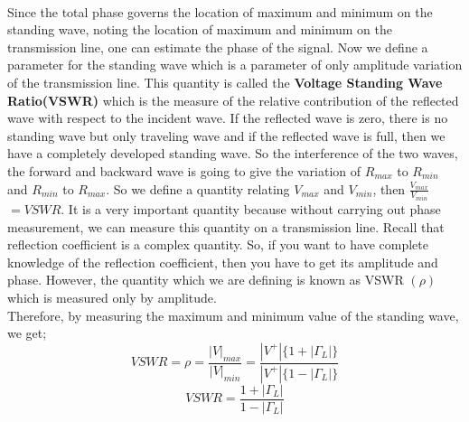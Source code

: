 	\\ Since the total phase governs the location of maximum and minimum on the standing wave, noting the location of maximum and minimum on the transmission line, one can estimate the phase of the signal. Now we define a parameter for the standing wave which is a parameter of only amplitude variation of the transmission line. This quantity is called the \textbf{Voltage Standing Wave Ratio(VSWR)} which is  the  measure of the relative contribution of the reflected wave with respect to the  incident wave. If the reflected wave is zero, there is no standing wave but only traveling wave and if the reflected wave is full, then we have a completely developed standing wave. So the interference of the two waves, the forward and backward wave is going to give the variation of $R_{max}$ to $R_{min}$ and $R_{min}$ to $R_{max}$. So we define a quantity relating $V_{max}$ and $V_{min}$, then $\frac{V_{max}}{V_{min}}$ $= VSWR$. It is a very important quantity because without carrying out phase measurement, we can measure this quantity on a transmission line. Recall that reflection coefficient is a complex quantity. So, if you want to have complete knowledge of the reflection coefficient, then you have to get its amplitude and phase. However, the quantity which we are defining is known as VSWR $(\rho)$ which is measured only by amplitude.\\
	 Therefore, by measuring the maximum and minimum value of the standing wave, we get;
	\begin{equation*}
	VSWR = \rho =\frac{|V|_{max}}{|V|_{min}} = \frac{|V^+|\{1+|\Gamma_L|\}}{|V^+|\{1-|\Gamma_L|\}}
	\end{equation*}
	\begin{equation}
	VSWR  = \frac{1+|\Gamma_L|}{1-|\Gamma_L|}	
	\end{equation}

